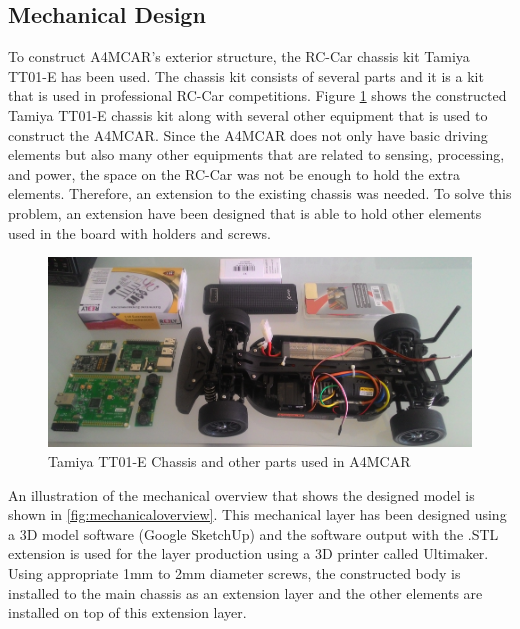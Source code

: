 \subsection{Mechanical Design}
To construct A4MCAR's exterior structure, the RC-Car chassis kit Tamiya TT01-E \cite{tt01e} has been used. The chassis kit consists of several parts and it is a kit that is used in professional RC-Car competitions. Figure \ref{fig:rccarparts} shows the constructed Tamiya TT01-E chassis kit along with several other equipment that is used to construct the A4MCAR. Since the A4MCAR does not only have basic driving elements but also many other equipments that are related to sensing, processing, and power, the space on the RC-Car was not be enough to hold the extra elements. Therefore, an extension to the existing chassis was needed. To solve this problem, an extension have been designed that is able to hold other elements used in the board with holders and screws. 
\begin{figure}[!ht]
	\centering
	\captionsetup{justification=centering}
	\includegraphics[width=\textwidth]{content/images/rccarparts.png}
	\caption{Tamiya TT01-E Chassis and other parts used in A4MCAR}
	\label{fig:rccarparts}
\end{figure}

An illustration of the mechanical overview that shows the designed model is shown in \ref{fig:mechanicaloverview}. This mechanical layer has been designed using a 3D model software (Google SketchUp) and the software output with the .STL extension is used for the layer production using a 3D printer called Ultimaker. Using appropriate 1mm to 2mm diameter screws, the constructed body is installed to the main chassis as an extension layer and the other elements are installed on top of this extension layer. 

